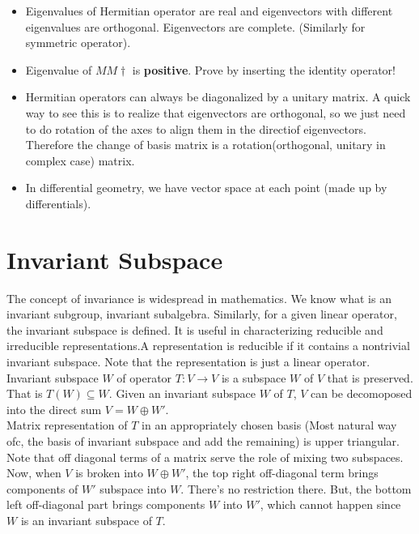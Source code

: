 \documentclass{report}
\begin{document}
\begin{itemize}
  \item Eigenvalues of Hermitian operator are real and eigenvectors with different eigenvalues are orthogonal. Eigenvectors are complete. (Similarly for symmetric operator).

  \item Eigenvalue of $MM\dagger$ is  \textbf{positive}. Prove by inserting the identity operator!

  \item Hermitian operators can always be diagonalized by a unitary matrix. A quick way to see this is to realize that eigenvectors are orthogonal, so we just need to do rotation of the axes to align them in the directiof eigenvectors. Therefore the change of basis matrix is a rotation(orthogonal, unitary in complex case) matrix.

  \item In differential geometry, we have vector space at each point (made up by differentials).

\end{itemize}

\section{Invariant Subspace}

The concept of invariance is widespread in mathematics. We know what is an invariant subgroup, invariant subalgebra. Similarly, for a given linear operator, the invariant subspace is defined. It is useful in characterizing reducible and irreducible representations.A representation is reducible if it contains a nontrivial invariant subspace. Note that the representation is just a linear operator. Invariant subspace $W$ of operator $T:V\rightarrow V$ is a subspace $W$ of $V$ that is preserved. That is $T(W)\subseteq W$. Given an invariant subspace $W$ of $T$, $V$ can be decomoposed into the direct sum $V = W \oplus W'$.\\

\noindent Matrix representation of $T$ in an appropriately chosen basis (Most natural way ofc, the basis of invariant subspace and add the remaining) is upper triangular. Note that off diagonal terms of a matrix serve the role of mixing two subspaces. Now, when $V$ is broken into $W\oplus W'$, the top right off-diagonal term brings components of $W'$ subspace into $W$. There's no restriction there. But, the bottom left off-diagonal part brings components $W$ into $W'$, which cannot happen since $W$ is an invariant subspace of $T$.
\end{document}
